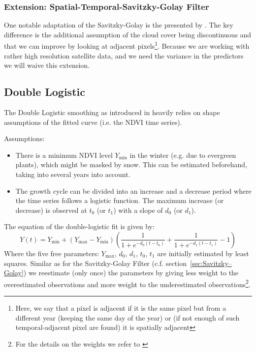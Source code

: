 \subsubsection*{Extension: Spatial-Temporal-Savitzky-Golay Filter}
One notable adaptation of the Savitzky-Golay is the presented by \cite{caoSimpleMethodImprove2018b}. The key difference is the additional assumption of the cloud cover being discontinuous and that we can improve by looking at adjacent pixels\footnote{Here, we say that a pixel is adjacent if it is the same pixel but from a different year (keeping the same day of the year) or (if not enough of such temporal-adjacent pixel are found) it is spatially adjacent}. Because we are working with rather high resolution satellite data, and we need the variance in the predictors we will waive this extension.

\subsection{Double Logistic}
\label{sec:double_logistic}
The Double Logistic smoothing as introduced in \cite{beckImprovedMonitoringVegetation2006} heavily relies on shape assumptions of the fitted curve (i.e. the NDVI time series).

Assumptions:
\begin{itemize}
    \item There is a minimum NDVI level $Y_{\min}$ in the winter (e.g. due to evergreen plants), which might be masked by snow. This can be estimated beforehand, taking into several years into account.
    \item The growth cycle can be divided into an increase and a decrease period where the time series follows a logistic function. The maximum increase (or decrease) is observed at $t_0$ (or $t_1$) with a slope of $d_0$ (or $d_1$).
\end{itemize}

The equation of the double-logistic fit is given by:
\begin{equation*}
    Y(t) = Y_{\min} + \left(Y_{\max}-Y_{\min}\right)\left(\frac{1}{1+e^{-d_0(t-t_0)}}+\frac{1}{1+e^{-d_1(t-t_1)}}-1\right)
\end{equation*}
Where the five free parameters: $Y_{\max}$, $d_0$, $d_1$, $t_0$, $t_1$ are initially estimated by least squares. Similar as for the Savitzky-Golay Filter (c.f. section~\ref{sec:Savitzky–Golay}) we reestimate (only once) the parameters by giving less weight to the overestimated observations and more weight to the underestimated observations\footnote{For the details on the weights we refer to \cite{beckImprovedMonitoringVegetation2006}}.

